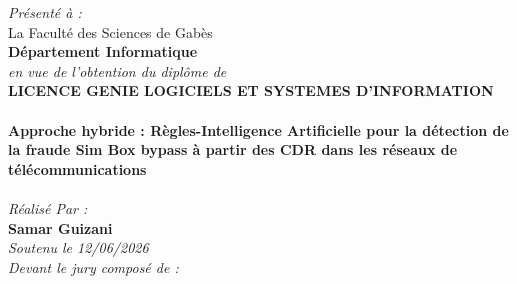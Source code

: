 \documentclass[12pt, oneside, a4paper]{report}
\begin{document}
\begin{titlepage}
\begin{center}
    {\fontsize{11pt}{14pt}\selectfont \textit{Présenté à :}} \\[0.4cm]
    {\fontsize{14pt}{18pt}\selectfont La Faculté des Sciences de Gabès} \\[0.8cm]

    {\fontsize{14pt}{18pt}\selectfont \textbf{Département Informatique}} \\[0.8cm]

    {\fontsize{11pt}{14pt}\selectfont \textit{en vue de l'obtention du diplôme de}} \\[0.4cm]
    {\fontsize{13pt}{16pt}\selectfont \textbf{\color{blue} LICENCE GENIE LOGICIELS ET SYSTEMES D'INFORMATION}} \\[0.6cm]

    \noindent{} \\[0.6cm]

    {\fontsize{14pt}{18pt}\selectfont \textbf{\color{blue} Approche hybride : Règles-Intelligence Artificielle pour la détection de la fraude Sim Box bypass à partir des CDR dans les réseaux de télécommunications 
}} \\[0.6cm]

    \noindent{} \\[0.8cm]

    {\fontsize{12pt}{15pt}\selectfont \textit{Réalisé Par :}} \\[0.4cm]
    {\fontsize{14pt}{18pt}\selectfont \textbf{\color{blue} Samar Guizani}} \\
    

    {\fontsize{13pt}{16pt}\selectfont \textit{Soutenu le 12/06/2026}} \\
    {\fontsize{12pt}{15pt}\selectfont \textit{Devant le jury composé de :}} \\[0.8cm]
    


\end{center}
\end{titlepage}
\end{document}
